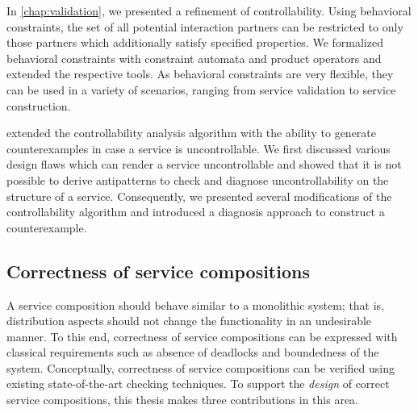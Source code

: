 \begin{niceitemize}
\item In \autoref{chap:validation}, we presented a refinement of controllability. Using behavioral constraints, the set of all potential interaction partners can be restricted to only those partners which additionally satisfy specified properties. We formalized behavioral constraints with constraint automata and product operators and extended the respective tools. As behavioral constraints are very flexible, they can be used in a variety of scenarios, ranging from service validation to service construction.

\item {} extended the controllability analysis algorithm with the ability to generate counterexamples in case a service is uncontrollable. We first discussed various design flaws which can render a service uncontrollable and showed that it is not possible to derive antipatterns to check and diagnose uncontrollability on the structure of a service. Consequently, we presented several modifications of the controllability algorithm and introduced a diagnosis approach to construct a counterexample.
\end{niceitemize}




\subsection*{Correctness of service compositions}

A service composition should behave similar to a monolithic system; that is, distribution aspects should not change the functionality in an undesirable manner. To this end, correctness of service compositions can be expressed with classical requirements such as absence of deadlocks and boundedness of the system. Conceptually, correctness of service compositions can be verified using existing state-of-the-art checking techniques. To support the \emph{design} of correct service compositions, this thesis makes three contributions in this area.


